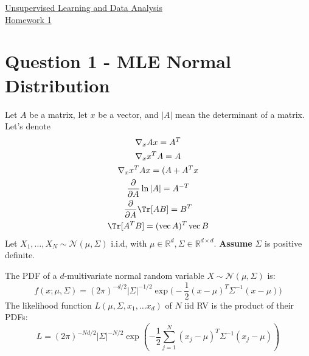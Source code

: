 \documentclass{article}
\begin{document}
\begin{center}
  {\huge \underline{Unsupervised Learning and Data Analysis} \\[5pt] \ul{Homework 1}}
\end{center}
\section*{Question 1 - MLE Normal Distribution}
Let $A$ be a matrix, let $x$ be a vector, and $|A|$ mean the determinant of a matrix.
Let's denote
\begin{gather}
  \nabla_{x} Ax = A^{T} \label{eq:gradX} \\
  \nabla_{x} x^{T}A = A \label{eq:gradXT} \\
  \nabla_{x} x^{T}Ax = (A+A^{T} x \label{eq:gradxtAx} \\
  \frac{\partial }{\partial A} \ln |A| = A^{-T} \label{eq:gradLnDet} \\
  \frac{\partial }{\partial A} \Tr [AB] = B^{T} \label{eq:gradTrProd} \\
  \Tr [A^{T} B] = (\operatorname{vec}A)^{T} \operatorname{vec}B
\end{gather}
Let $X_1, \ldots, X_{N} \sim \mathcal{N}(\mu, \Sigma)$ i.i.d, with $\mu \in \mathbb{R}^{d}, \Sigma \in \mathbb{R}^{d \times d}$.  \textbf{Assume} $\Sigma$ is positive definite. 

The PDF of a $d$-multivariate normal random variable $X \sim \mathcal{N}(\mu, \Sigma)$ is:
\[
  f(x ; \mu, \Sigma) = (2 \pi)^{-d/2} | \Sigma |^{-1/2} \exp \big( -\frac{1}{2} (x-\mu)^{T} \Sigma ^{-1}  (x-\mu) \big)
\]
The likelihood function $L(\mu, \Sigma, x_1, \ldots  x_d)$ of $N$ iid RV is the product of their PDFs:
\[
  L = (2 \pi )^{-Nd/2} | \Sigma|^{-N/2} \exp \left( -\frac{1}{2} \sum_{j=1}^{N} (x_j-\mu)^{T} \Sigma ^{-1}  (x_j-\mu) \right) 
\]
\end{document}
